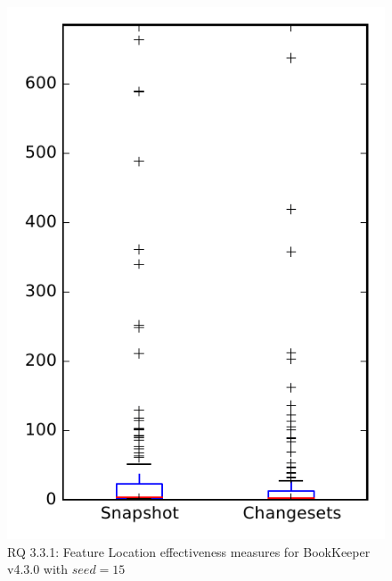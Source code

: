 
\begin{figure}
\centering
\includegraphics[height=0.4\textheight]{figures/flt_seed/rq1_bookkeeper_15}
\caption{RQ 3.3.1: Feature Location effectiveness measures for BookKeeper v4.3.0 with $seed=15$}
\label{fig:flt_seed:rq1:bookkeeper}
\end{figure}

